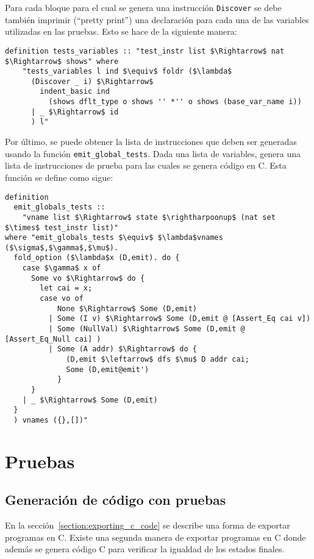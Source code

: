 Para cada bloque para el cual se genera una instrucción \verb|Discover| se debe también imprimir (``pretty print'') una declaración para cada una de las variables utilizadas en las pruebas.
Esto se hace de la siguiente manera:

\begin{lstlisting}[mathescape=true, frame=single]
  definition tests_variables :: "test_instr list $\Rightarrow$ nat $\Rightarrow$ shows" where
    "tests_variables l ind $\equiv$ foldr ($\lambda$
      (Discover _ i) $\Rightarrow$
        indent_basic ind
          (shows dflt_type o shows '' *'' o shows (base_var_name i))
      | _ $\Rightarrow$ id
      ) l"
\end{lstlisting}


Por último, se puede obtener la lista de instrucciones que deben ser generadas usando la función \verb|emit_global_tests|.
Dada una lista de variables, genera una lista de instrucciones de prueba para las cuales se genera código en C.
Esta función se define como sigue:


\begin{lstlisting}[mathescape=true, frame=single]
definition
  emit_globals_tests ::
    "vname list $\Rightarrow$ state $\rightharpoonup$ (nat set $\times$ test_instr list)"
where "emit_globals_tests $\equiv$ $\lambda$vnames ($\sigma$,$\gamma$,$\mu$).
  fold_option ($\lambda$x (D,emit). do {
    case $\gamma$ x of
      Some vo $\Rightarrow$ do {
        let cai = x;
        case vo of
            None $\Rightarrow$ Some (D,emit)
          | Some (I v) $\Rightarrow$ Some (D,emit @ [Assert_Eq cai v])
          | Some (NullVal) $\Rightarrow$ Some (D,emit @ [Assert_Eq_Null cai] )
          | Some (A addr) $\Rightarrow$ do {
              (D,emit $\leftarrow$ dfs $\mu$ D addr cai;
              Some (D,emit@emit')
            }
      }
    | _ $\Rightarrow$ Some (D,emit)
  }
  ) vnames ({},[])"
\end{lstlisting}


\section{Pruebas}

\subsection{Generación de código con pruebas}\label{subsection:codegen_with_tests}

En la sección~\ref{section:exporting_c_code} se describe una forma de exportar programas en C.
Existe una segunda manera de exportar programas en C donde además se genera código C para verificar la igualdad de los estados finales.

